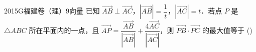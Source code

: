 
\begin{problem}{2015}{G}{福建卷（理）}{9}{向量}
已知 $ \overrightarrow{AB} \perp \overrightarrow{AC} $，$ \left| \overrightarrow{AB} \right| = \dfrac{1}{t} $，$ \left| \overrightarrow{AC} \right| = t $．若点 $ P $ 是 $ \triangle ABC $ 所在平面内的一点，且 $ \overrightarrow{AP} = \dfrac{\overrightarrow{AB}}{\left| \overrightarrow{AB} \right|} + \dfrac{4\overrightarrow{AC}}{\left| \overrightarrow{AC} \right|} $，则 $ \overrightarrow{PB} \cdot \overrightarrow{PC} $ 的最大值等于 (\hspace{1cm})
\begin{choices}
\end{choices}
\end{problem}

\begin{answer}

\end{answer}

\begin{solutions}

\end{solutions}